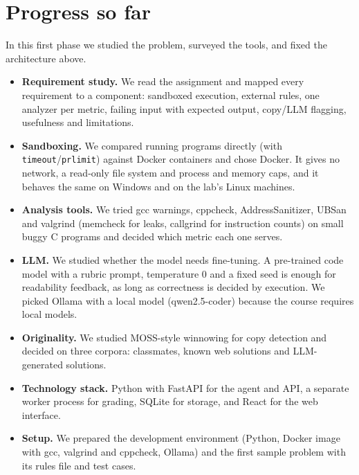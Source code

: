 \documentclass[11pt,a4paper]{article}
\begin{document}
\section{Progress so far}
In this first phase we studied the problem, surveyed the tools, and fixed the architecture above.
\begin{itemize}
  \item \textbf{Requirement study.} We read the assignment and mapped every requirement to a component: sandboxed execution, external rules, one analyzer per metric, failing input with expected output, copy/LLM flagging, usefulness and limitations.
  \item \textbf{Sandboxing.} We compared running programs directly (with \texttt{timeout}/\texttt{prlimit}) against Docker containers and chose Docker. It gives no network, a read-only file system and process and memory caps, and it behaves the same on Windows and on the lab's Linux machines.
  \item \textbf{Analysis tools.} We tried gcc warnings, cppcheck, AddressSanitizer, UBSan and valgrind (memcheck for leaks, callgrind for instruction counts) on small buggy C programs and decided which metric each one serves.
  \item \textbf{LLM.} We studied whether the model needs fine-tuning. A pre-trained code model with a rubric prompt, temperature 0 and a fixed seed is enough for readability feedback, as long as correctness is decided by execution. We picked Ollama with a local model (qwen2.5-coder) because the course requires local models.
  \item \textbf{Originality.} We studied MOSS-style winnowing for copy detection and decided on three corpora: classmates, known web solutions and LLM-generated solutions.
  \item \textbf{Technology stack.} Python with FastAPI for the agent and API, a separate worker process for grading, SQLite for storage, and React for the web interface.
  \item \textbf{Setup.} We prepared the development environment (Python, Docker image with gcc, valgrind and cppcheck, Ollama) and the first sample problem with its rules file and test cases.
\end{itemize}

\end{document}
